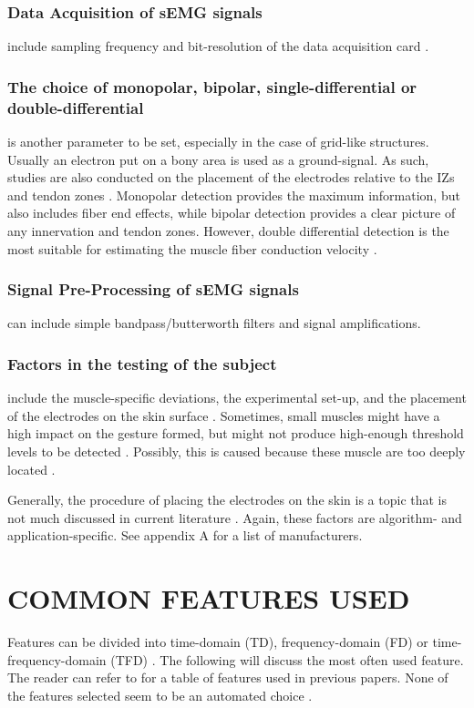 \documentclass{article}
\begin{document}
\subsubsection{Data Acquisition of sEMG signals} include sampling frequency and bit-resolution of the data acquisition card \cite{Kilby2016}. 
\subsubsection{The choice of monopolar, bipolar, single-differential or double-differential} is another parameter to be set, especially in the case of grid-like structures. Usually an electron put on a bony area is used as a ground-signal. As such, studies are also conducted on the placement of the electrodes relative to the IZs and tendon zones \cite{Beck2009} \cite{Beck2008}. Monopolar detection provides the maximum information, but also includes fiber end effects, while bipolar detection provides a clear picture of any innervation and tendon zones. However, double differential detection is the most suitable for estimating the muscle fiber conduction velocity \cite{Kilby2016}. 
\subsubsection{Signal Pre-Processing of sEMG signals} \cite{Kilby2016} can include simple bandpass/butterworth filters and signal amplifications.  
\subsubsection{Factors in the testing of the subject} include the muscle-specific deviations, the experimental set-up, and the placement of the electrodes on the skin surface \cite{Kilby2016}. Sometimes, small muscles might have a high impact on the gesture formed, but might not produce high-enough threshold levels to be detected \cite{McIntosh2016}. Possibly, this is caused because these muscle are too deeply located \cite{El-Khoury2015}.

Generally, the procedure of placing the electrodes on the skin is a topic that is not much discussed in current literature \cite{Kilby2016} \cite{Ghapanchizadeh2017}. Again, these factors are algorithm- and application-specific. See appendix A for a list of manufacturers.


\section{COMMON FEATURES USED \cite{Nazmi2016}}
Features can be divided into time-domain (TD), frequency-domain (FD) or time-frequency-domain (TFD) \cite{Tsai2014} \cite{Hogan1980} \cite{Englehart1999} \cite{Nazmi2016}. The following will discuss the most often used feature. The reader can refer to \cite{Nazmi2016} for a table of features used in previous papers. None of the features selected seem to be an automated choice \cite{Nazmi2016}.
\end{document}
